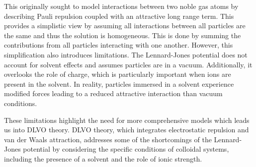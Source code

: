 
This originally sought to model interactions between two noble gas atoms by describing Pauli repulsion coupled with an attractive long range term. This provides a simplistic view by assuming all interactions between all particles are the same and thus the solution is homogeneous. This is done by summing the contributions from all particles interacting with one another. However, this simplification also introduces limitations. The Lennard-Jones potential does not account for solvent effects and assumes particles are in a vacuum. Additionally, it overlooks the role of charge, which is particularly important when ions are present in the solvent. In reality, particles immersed in a solvent experience modified forces leading to a reduced attractive interaction than vacuum conditions.
\cite{lilBlueBook}








These limitations highlight the need for more comprehensive models which leads us into DLVO theory. DLVO theory, which integrates electrostatic repulsion and van der Waals attraction, addresses some of the shortcomings of the Lennard-Jones potential by considering the specific conditions of colloidal systems, including the presence of a solvent and the role of ionic strength.\cite{} %


